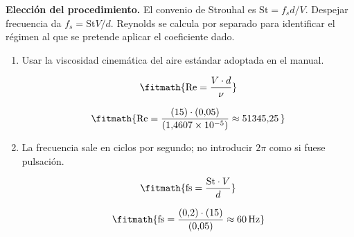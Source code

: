 \noindent\textbf{Elección del procedimiento.} El convenio de Strouhal es $\mathrm{St}=f_sd/V$. Despejar frecuencia da $f_s=\mathrm{St}V/d$. Reynolds se calcula por separado para identificar el régimen al que se pretende aplicar el coeficiente dado.

\begin{enumerate}

\item Usar la viscosidad cinemática del aire estándar adoptada en el manual.

\[\fitmath{\mathrm{Re}=\frac{V\cdot d}{\nu}}\]

\[\fitmath{\mathrm{Re}=\frac{(15)\cdot (0{,}05)}{(1{,}4607\times10^{-5})}\approx 51345{,}25\,}\]

\item La frecuencia sale en ciclos por segundo; no introducir $2\pi$ como si fuese pulsación.

\[\fitmath{\mathrm{fs}=\frac{\mathrm{St}\cdot V}{d}}\]

\[\fitmath{\mathrm{fs}=\frac{(0{,}2)\cdot (15)}{(0{,}05)}\approx 60\,\mathrm{Hz}}\]

\end{enumerate}
